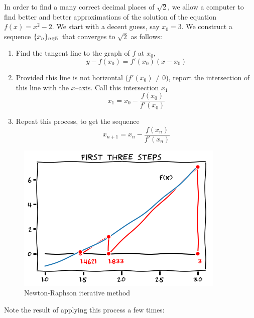 \begin{example}
In order to find a many correct decimal places of $\sqrt{2}$, we allow a computer to find better and better approximations of the solution of the equation $f(x)=x^2-2$.  We start with a decent guess, say $x_0=3$.  We construct a sequence $\{ x_n \}_{n\in\mathbb{N}}$ that converges to $\sqrt{2}$ as follows:
\begin{enumerate}
\item Find the tangent line to the graph of $f$ at $x_0$, 
\begin{equation*}
y-f(x_0)=f'(x_0)(x-x_0)
\end{equation*}
\item Provided this line is not horizontal ($f'(x_0)\neq 0$), report the intersection of this line with the $x$--axis.  Call this intersection $x_1$
\begin{equation*}
x_1=x_0-\frac{f(x_0)}{f'(x_0)}
\end{equation*}
\item Repeat this process, to get the sequence 
\begin{equation*}
x_{n+1} = x_n- \frac{f(x_n)}{f'(x_n)}
\end{equation*}
\end{enumerate}
\begin{figure}[ht!]
\includegraphics[width=0.65\linewidth]{newton1.png}
\caption{Newton-Raphson iterative method}
\label{figure:Newton-Raphson}
\end{figure}
Note the result of applying this process a few times:


\end{example}

